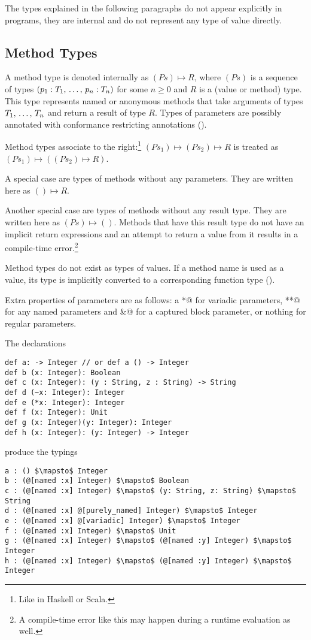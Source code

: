 The types explained in the following paragraphs do not appear explicitly in programs, they are internal and do not represent any type of value directly. 






\subsection{Method Types}
\label{sec:method-types}

A method type is denoted internally as $(Ps) \mapsto R$, where $(Ps)$ is a sequence of types  $(p_1 : T_1 ,\, \ldots ,\, p_n : T_n)$ for some $n \geq 0$ and $R$ is a (value or method) type. This type represents named or anonymous methods that take arguments of types $T_1 ,\, \ldots ,\, T_n$ and return a result of type $R$. Types of parameters are possibly annotated with conformance restricting annotations (). 

Method types associate to the right:\footnote{Like in Haskell or Scala.} \newline
$(Ps_1) \mapsto (Ps_2) \mapsto R$ is treated as $(Ps_1) \mapsto ((Ps_2) \mapsto R)$. 

A special case are types of methods without any parameters. They are written here as $() \mapsto R$. 

Another special case are types of methods without any result type. They are written here as $(Ps) \mapsto ()$. Methods that have this result type do not have an implicit return expressions and an attempt to return a value from it results in a compile-time error.\footnote{A compile-time error like this may happen during a runtime evaluation as well.}

Method types do not exist as types of values. If a method name is used as a value, its type is implicitly converted to a corresponding function type (). 

Extra properties of parameters are as follows: a \lstinline@*@ for variadic parameters, \lstinline@**@ for any named parameters and \lstinline@&@ for a captured block parameter, or nothing for regular parameters. 

\example The declarations
\begin{lstlisting}
def a: -> Integer // or def a () -> Integer
def b (x: Integer): Boolean
def c (x: Integer): (y : String, z : String) -> String
def d (~x: Integer): Integer
def e (*x: Integer): Integer
def f (x: Integer): Unit
def g (x: Integer)(y: Integer): Integer
def h (x: Integer): (y: Integer) -> Integer
\end{lstlisting}
produce the typings
\begin{lstlisting}
a : () $\mapsto$ Integer
b : (@[named :x] Integer) $\mapsto$ Boolean
c : (@[named :x] Integer) $\mapsto$ (y: String, z: String) $\mapsto$ String
d : (@[named :x] @[purely_named] Integer) $\mapsto$ Integer
e : (@[named :x] @[variadic] Integer) $\mapsto$ Integer
f : (@[named :x] Integer) $\mapsto$ Unit
g : (@[named :x] Integer) $\mapsto$ (@[named :y] Integer) $\mapsto$ Integer
h : (@[named :x] Integer) $\mapsto$ (@[named :y] Integer) $\mapsto$ Integer
\end{lstlisting}

